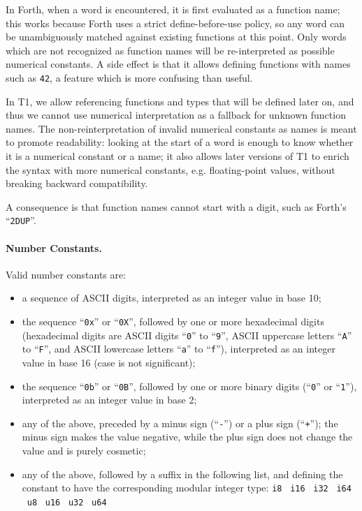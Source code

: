 \begin{rationale}
In Forth, when a word is encountered, it is first evaluated as a
function name; this works because Forth uses a strict define-before-use
policy, so any word can be unambiguously matched against existing
functions at this point. Only words which are not recognized as function
names will be re-interpreted as possible numerical constants. A side
effect is that it allows defining functions with names such as
\verb+42+, a feature which is more confusing than useful.

In T1, we allow referencing functions and types that will be defined
later on, and thus we cannot use numerical interpretation as a fallback
for unknown function names. The non-reinterpretation of invalid
numerical constants as names is meant to promote readability: looking at
the start of a word is enough to know whether it is a numerical constant
or a name; it also allows later versions of T1 to enrich the syntax with
more numerical constants, e.g. floating-point values, without breaking
backward compatibility.

A consequence is that function names cannot start with a digit, such as
Forth's ``\verb+2DUP+''.
\end{rationale}

\paragraph{Number Constants.} Valid number constants are:
\begin{itemize}

    \item a sequence of ASCII digits, interpreted as an integer value
    in base 10;

    \item the sequence ``\verb|0x|'' or ``\verb|0X|'', followed by
    one or more hexadecimal digits (hexadecimal digits are ASCII digits
    ``\verb|0|'' to ``\verb|9|'', ASCII uppercase letters
    ``\verb|A|'' to ``\verb|F|'', and ASCII lowercase letters
    ``\verb|a|'' to ``\verb|f|''), interpreted as an integer value
    in base 16 (case is not significant);

    \item the sequence ``\verb|0b|'' or ``\verb|0B|'', followed by one
    or more binary digits (``\verb|0|'' or ``\verb|1|''), interpreted as
    an integer value in base 2;

    \item any of the above, preceded by a minus sign (``\verb|-|'') or a
    plus sign (``\verb|+|''); the minus sign makes the value negative,
    while the plus sign does not change the value and is purely
    cosmetic;

    \item any of the above, followed by a suffix in the following list,
    and defining the constant to have the corresponding modular integer
    type: \verb|i8| \ \verb|i16| \ \verb|i32| \ \verb|i64| \ \verb|u8|
    \ \verb|u16| \ \verb|u32| \ \verb|u64|

\end{itemize}

